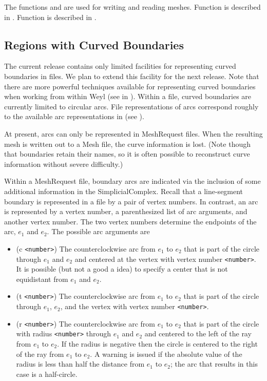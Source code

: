 The functions  and  are used
for writing and reading meshes.  Function  is
described in .  Function 
is described in .

\subsection{Regions with Curved Boundaries}

The current release contains only limited facilities for representing
curved boundaries in files.  We plan to extend this facility for the
next release.  Note that there are more powerful techniques available
for representing curved boundaries when working from within Weyl (see
 in ).
Within a file, curved boundaries are currently limited to circular
arcs.  File representations of arcs correspond roughly to the
available arc representations in  (see
).  

At present, arcs can only be represented in MeshRequest files.  When
the resulting mesh is written out to a Mesh file, the curve
information is lost.  (Note though that boundaries retain their names,
so it is often possible to reconstruct curve information without
severe difficulty.)

Within a MeshRequest file, boundary arcs are indicated via the
inclusion of some additional information in the SimplicialComplex.
Recall that a line-segment boundary is represented in a file by a pair
of vertex numbers.  In contrast, an arc is represented by a vertex
number, a parenthesized list of arc arguments, and another vertex
number.  The two vertex numbers determine the endpoints of the arc,
$e_1$ and $e_2$.  The possible arc arguments are

\begin{itemize}

\item {\sf (c \verb+<number>+)}
The counterclockwise arc from $e_1$ to $e_2$ that is part of the
circle through $e_1$ and $e_2$ and centered at the vertex with vertex
number \verb+<number>+.  It is possible (but not a good a idea) to
specify a center that is not equidistant from $e_1$ and $e_2$.

\item {\sf (t \verb+<number>+)}
The counterclockwise arc from $e_1$ to $e_2$ that is part of the
circle through $e_1$, $e_2$, and the vertex with vertex number
\verb+<number>+.

\item {\sf (r \verb+<number>+)}
The counterclockwise arc from $e_1$ to $e_2$ that is part of the
circle with radius \verb+<number>+ through $e_1$ and $e_2$ and centered
to the left of the ray from $e_1$ to $e_2$.  If the radius is negative
then the circle is centered to the right of the ray from $e_1$ to
$e_2$.  A warning is issued if the absolute value of the radius is
less than half the distance from $e_1$ to $e_2$; the arc that results
in this case is a half-circle.

\end{itemize}

